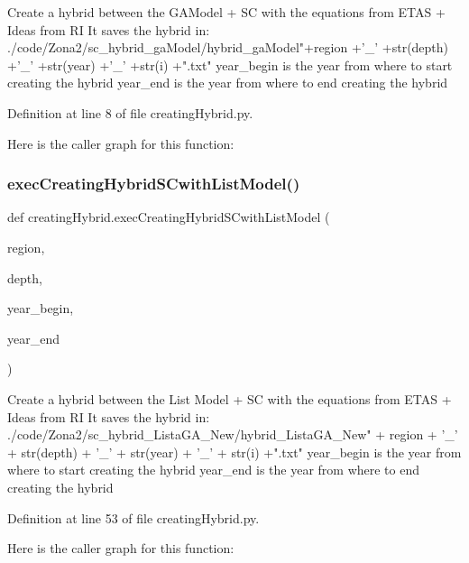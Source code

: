 \begin{DoxyVerb}Create a hybrid between the GAModel + SC with the equations from ETAS + Ideas from RI
It saves the hybrid in: ./code/Zona2/sc_hybrid_gaModel/hybrid_gaModel"+region +'_' +str(depth) +'_' +str(year) +'_' +str(i) +".txt"
year_begin is the year from where to start creating the hybrid
year_end is the year from where to end creating the hybrid
\end{DoxyVerb}
 

Definition at line 8 of file creating\+Hybrid.\+py.

Here is the caller graph for this function\+:
\mbox{\label{namespacecreating_hybrid_a494fec3281195003a2830c2ee78f63f5}} 
\subsubsection{\texorpdfstring{exec\+Creating\+Hybrid\+S\+Cwith\+List\+Model()}{execCreatingHybridSCwithListModel()}}
{\footnotesize\ttfamily def creating\+Hybrid.\+exec\+Creating\+Hybrid\+S\+Cwith\+List\+Model (\begin{DoxyParamCaption}\item[{}]{region,  }\item[{}]{depth,  }\item[{}]{year\+\_\+begin,  }\item[{}]{year\+\_\+end }\end{DoxyParamCaption})}

\begin{DoxyVerb}Create a hybrid between the List Model + SC with the equations from ETAS + Ideas from RI
It saves the hybrid in: ./code/Zona2/sc_hybrid_ListaGA_New/hybrid_ListaGA_New" + region + '_' + str(depth) + '_' + str(year) + '_' + str(i) +".txt"
year_begin is the year from where to start creating the hybrid
year_end is the year from where to end creating the hybrid
\end{DoxyVerb}
 

Definition at line 53 of file creating\+Hybrid.\+py.

Here is the caller graph for this function\+:
\mbox{\label{namespacecreating_hybrid_af775563b0fc8f5b99a72d0d323956802}} 
